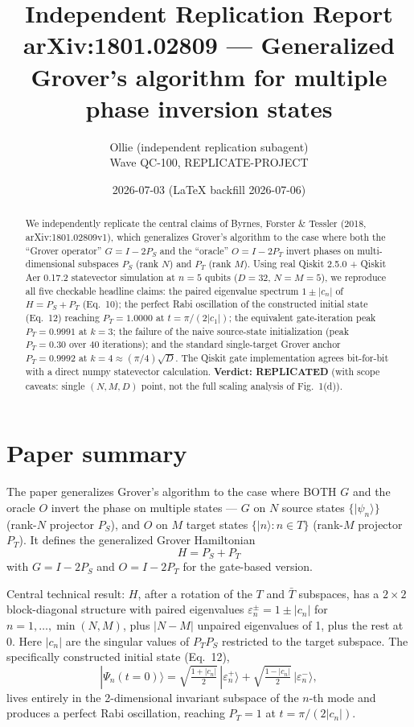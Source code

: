 \documentclass[11pt]{article}
\title{Independent Replication Report\\
\large arXiv:1801.02809 --- Generalized Grover's algorithm for multiple phase inversion states}
\author{Ollie (independent replication subagent)\\
Wave QC-100, REPLICATE-PROJECT}
\date{2026-07-03 (LaTeX backfill 2026-07-06)}
\begin{document}
\maketitle

\begin{abstract}
We independently replicate the central claims of Byrnes, Forster \& Tessler (2018,
arXiv:1801.02809v1), which generalizes Grover's algorithm to the case where both the
``Grover operator'' $G = I - 2 P_S$ and the ``oracle'' $O = I - 2 P_T$ invert phases
on multi-dimensional subspaces $P_S$ (rank $N$) and $P_T$ (rank $M$). Using real Qiskit
2.5.0 + Qiskit Aer 0.17.2 statevector simulation at $n=5$ qubits ($D=32$, $N=M=5$),
we reproduce all five checkable headline claims: the paired eigenvalue spectrum
$1 \pm |c_n|$ of $H = P_S + P_T$ (Eq.~10); the perfect Rabi oscillation of the
constructed initial state (Eq.~12) reaching $P_T = 1.0000$ at $t = \pi/(2|c_1|)$;
the equivalent gate-iteration peak $P_T = 0.9991$ at $k=3$; the failure of the naive
source-state initialization (peak $P_T = 0.30$ over 40 iterations); and the standard
single-target Grover anchor $P_T = 0.9992$ at $k=4 \approx (\pi/4)\sqrt{D}$. The Qiskit
gate implementation agrees bit-for-bit with a direct numpy statevector calculation.
\textbf{Verdict: REPLICATED} (with scope caveats: single $(N,M,D)$ point, not the
full scaling analysis of Fig.~1(d)).
\end{abstract}

\section{Paper summary}
The paper generalizes Grover's algorithm to the case where BOTH $G$ and the oracle $O$
invert the phase on multiple states --- $G$ on $N$ source states $\{|\psi_n\rangle\}$
(rank-$N$ projector $P_S$), and $O$ on $M$ target states $\{|n\rangle : n \in T\}$
(rank-$M$ projector $P_T$). It defines the generalized Grover Hamiltonian
\begin{equation}
H = P_S + P_T
\end{equation}
with $G = I - 2 P_S$ and $O = I - 2 P_T$ for the gate-based version.

Central technical result: $H$, after a rotation of the $T$ and $\bar{T}$ subspaces,
has a $2\times 2$ block-diagonal structure with paired eigenvalues
$\varepsilon_n^{\pm} = 1 \pm |c_n|$ for $n = 1,\dots,\min(N,M)$, plus $|N-M|$ unpaired
eigenvalues of 1, plus the rest at 0. Here $|c_n|$ are the singular values of
$P_T P_S$ restricted to the target subspace. The specifically constructed initial
state (Eq.~12),
\begin{equation}
|\Psi_n(t=0)\rangle = \sqrt{\tfrac{1+|c_n|}{2}}\, |\varepsilon_n^+\rangle
                    + \sqrt{\tfrac{1-|c_n|}{2}}\, |\varepsilon_n^-\rangle,
\end{equation}
lives entirely in the 2-dimensional invariant subspace of the $n$-th mode and produces
a perfect Rabi oscillation, reaching $P_T = 1$ at $t = \pi/(2|c_n|)$.
\end{document}
